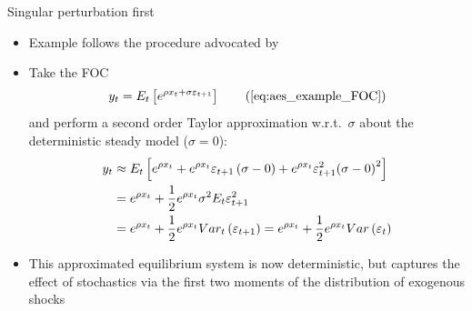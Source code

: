 \renewcommand{\Source}{\textcite{Evers2012}}
\begin{frame}{Singular perturbation first}
  \begin{itemize}
    \item Example follows the procedure advocated by \textcite{Evers2012}
    \item Take the FOC
          \begin{equation}
            y_t = {E_t}\left[ {{e^{\rho {x_t} + \sigma{\varepsilon _{t + 1}}}}} \right] \tag{\ref{eq:aes_example_FOC}}
          \end{equation}
          and perform a second order Taylor approximation w.r.t.\ $\sigma$ about the deterministic steady model ($\sigma=0$):
          \begin{align}
            {y_t} & \approx {E_t}\left[ {{e^{\rho {x_t}}} + {e^{\rho {x_t}}}{\varepsilon _{t + 1}}\left( {\sigma  - 0} \right) + {e^{\rho {x_t}}}\varepsilon _{t + 1}^2{{\left( {\sigma  - 0} \right)}^2}} \right] \notag                \\
                  & = {e^{\rho {x_t}}} + \frac{1}{2}{e^{\rho {x_t}}}{\sigma ^2}{E_t}\varepsilon _{t + 1}^2 \notag                                                                                                                        \\
                  & = {e^{\rho {x_t}}} + \frac{1}{2}{e^{\rho {x_t}}}Var_t\left( {{\varepsilon _{t+1}}} \right) =  {e^{\rho {x_t}}} + \frac{1}{2}{e^{\rho {x_t}}}Var\left( {{\varepsilon _{t}}} \right) \label{eq:aes_example_aes_system}
          \end{align}
    \item This approximated equilibrium system is now deterministic, but captures the effect of stochastics via the first two moments of the distribution of exogenous shocks
  \end{itemize}
\end{frame}

